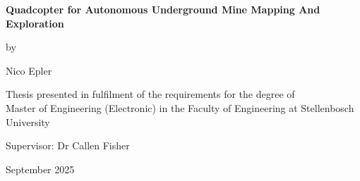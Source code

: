 \graphicspath{{frontmatter/fig/}}

\begin{titlepage}

	\begin{center}			
		\vfill
        \vfill
        \vfill
		{\bfseries \huge Quadcopter for Autonomous Underground Mine Mapping And Exploration \par}
		\vfill
        {\large by \\[5pt]}
		{\Large {\Large Nico Epler} \par}
		\vfill
		\vfill


		{\large Thesis presented in fulfilment of the requirements for the degree of \\ Master of Engineering (Electronic) in the Faculty of Engineering at Stellenbosch University \par}
		
		

		\vfill
		
		{\large {Supervisor}: Dr Callen Fisher}\par

		\vfill
		{\large September 2025}
        \vfill
	\end{center}
\end{titlepage}
